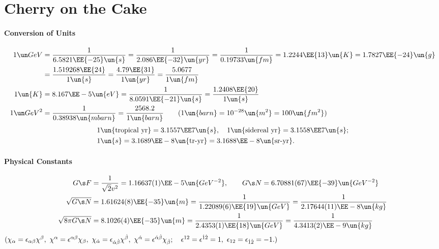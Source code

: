 \section{Cherry on the Cake}
\paragraph{Conversion of Units}
\begin{align}
 1\GeV &= \frac1{6.5821\EE{-25}\un{s}} = \frac1{2.086\EE{-32}\un{yr}}
        = \frac1{0.19733\un{fm}}  = 1.2244\EE{13}\un{K} = 1.7827\EE{-24}\un{g}\notag\\
       &= \frac{1.519268\EE{24}}{1\un{s}} = \frac{4.79\EE{31}}{1\un{yr}}
        = \frac{5.0677}{1\un{fm}}\\
1\un{K}&= 8.167\EE-5\un{eV} = \frac1{8.0591\EE{-21}\un{s}} = \frac{1.2408\EE{20}}{1\un{s}}\\
1\GeV^2&= \frac1{0.38938\un{mbarn}} = \frac{2568.2}{1\un{barn}}\qquad(1\un{barn}=10^{-28}\un{m^2} = 100\un{fm^2})
\end{align}
\vspace{-2zw}
\begin{equation}\begin{split}
 &1\un{\text{tropical yr}} = 3.1557\EE7\un{s},\quad 1\un{\text{sidereal yr}} = 3.1558\EE7\un{s};\\
 &1\un{s} = 3.1689\EE-8\un{\text{tr-yr}} = 3.1688\EE-8\un{\text{sr-yr}}.
\end{split}\end{equation}
\paragraph{Physical Constants}
\begin{align}
 G\s F &= \frac{1}{\sqrt2v^2} = 1.16637(1)\EE-5\un{GeV^{-2}},\qquad
 G\s N = 6.70881(67)\EE{-39}\un{GeV^{-2}}\\
 \sqrt{G\s N} &= 1.61624(8)\EE{-35}\un{m} = \frac1{1.22089(6)\EE{19}\un{GeV}}
               = \frac1{2.17644(11)\EE-8\un{kg}}\\
 \sqrt{8\pi G\s N}&= 8.1026(4)\EE{-35}\un{m} = \frac1{2.4353(1)\EE{18}\un{GeV}}
                   = \frac1{4.3413(2)\EE-9\un{kg}}
\end{align}
$(\chi_\alpha=\epsilon_{\alpha\beta}\chi^\beta,\
  \chi^\alpha=\epsilon^{\alpha\beta}\chi_\beta,\
  \chi_{\dot\alpha}=\epsilon_{{\dot\alpha}{\dot\beta}}\chi^{\dot\beta},\
  \chi^{\dot\alpha}=\epsilon^{{\dot\alpha}{\dot\beta}}\chi_{\dot\beta};\quad
  \epsilon^{12}=\epsilon^{\dot1\dot2}=1, \
  \epsilon_{12}=\epsilon_{\dot1\dot2}=-1.)$

